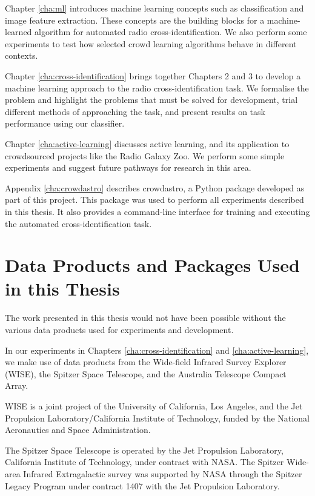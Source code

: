   Chapter \ref{cha:ml} introduces machine learning concepts such as
  classification and image feature extraction. These concepts are the building
  blocks for a machine-learned algorithm for automated radio
  cross-identification. We also perform some experiments to test how selected
  crowd learning algorithms behave in different contexts.

  Chapter \ref{cha:cross-identification} brings together Chapters 2 and 3 to
  develop a machine learning approach to the radio cross-identification task. We
  formalise the problem and highlight the problems that must be solved for
  development, trial different methods of approaching the task, and present
  results on task performance using our classifier.

  Chapter \ref{cha:active-learning} discusses active learning, and its
  application to crowdsourced projects like the Radio Galaxy Zoo. We perform
  some simple experiments and suggest future pathways for research in this area.

  Appendix \ref{cha:crowdastro} describes crowdastro, a Python package developed
  as part of this project. This package was used to perform all experiments
  described in this thesis. It also provides a command-line interface for
  training and executing the automated cross-identification task.

\section{Data Products and Packages Used in this Thesis}
\label{sec:data-products}
  
  The work presented in this thesis would not have been possible without the
  various data products used for experiments and development.

  In our experiments in Chapters \ref{cha:cross-identification} and
  \ref{cha:active-learning}, we make use of data products from the Wide-field
  Infrared Survey Explorer (WISE), the Spitzer Space Telescope, and the
  Australia Telescope Compact Array.

  WISE is a joint project of the University of California, Los Angeles, and the
  Jet Propulsion Laboratory/California Institute of Technology, funded by the
  National Aeronautics and Space Administration.

  The Spitzer Space Telescope is operated by the Jet Propulsion Laboratory,
  California Institute of Technology, under contract with NASA. The Spitzer
  Wide-area Infrared Extragalactic survey was supported by NASA through the
  Spitzer Legacy Program under contract 1407 with the Jet Propulsion Laboratory.

